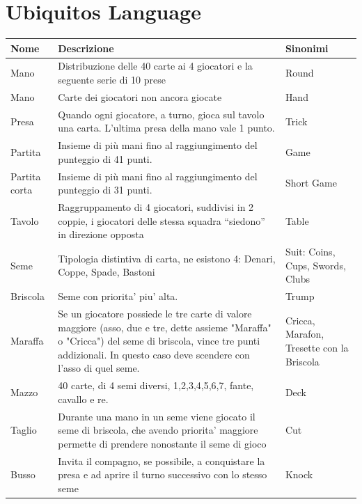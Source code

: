\newpage



\section{Ubiquitos Language}
\begin{table}[!ht]
    \centering
    \begin{adjustbox}{max width=1.1\textwidth,center}
    \begin{tabular}{|l|p{10cm}|l|}
    \hline
        Nome & Descrizione & Sinonimi \\ \hline
        Mano & Distribuzione delle 40 carte ai 4 giocatori e la seguente serie di 10 prese & Round \\ \hline
        Mano & Carte dei giocatori non ancora giocate & Hand \\ \hline
        Presa & Quando ogni giocatore, a turno, gioca sul tavolo una carta. L’ultima presa della mano vale 1 punto. & Trick \\ \hline
        Partita & Insieme di più mani fino al raggiungimento del punteggio di 41 punti. & Game \\ \hline
        Partita corta & Insieme di più mani fino al raggiungimento del punteggio di 31 punti. & Short Game \\ \hline
        Tavolo & Raggruppamento di 4 giocatori, suddivisi in 2 coppie, i giocatori delle stessa squadra “siedono” in direzione opposta & Table \\ \hline
        Seme & Tipologia distintiva di carta, ne esistono 4: Denari, Coppe, Spade, Bastoni & Suit: Coins, Cups, Swords, Clubs~ \\ \hline
        Briscola & Seme con priorita’ piu’ alta. & Trump \\ \hline
        Maraffa & Se un giocatore possiede le tre carte di valore maggiore (asso, due e tre, dette assieme "Maraffa" o "Cricca")
        del seme di briscola, vince tre punti addizionali. In questo caso deve scendere con l'asso di quel seme. & Cricca, Marafon, Tresette con la Briscola \\ \hline
        Mazzo & 40 carte, di 4 semi diversi, 1,2,3,4,5,6,7, fante, cavallo e re. & Deck \\ \hline
        Taglio & Durante una mano in un seme viene giocato il seme di briscola, che avendo priorita’ maggiore
        permette di prendere nonostante il seme di gioco & Cut \\ \hline
        Busso & Invita il compagno, se possibile, a conquistare la presa e ad aprire il turno successivo con lo stesso seme & Knock \\ \hline

\end{tabular}
\end{adjustbox}
\end{table}
